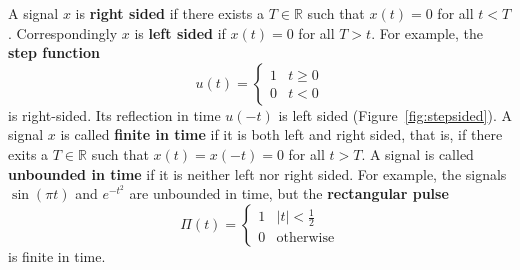 \documentclass[11pt,a4paper]{book}
\theoremstyle{plain}
\numberwithin{equation}{section}
\newcommand{\reals}{{\mathbb R}}
\newcommand{\term}{\textbf}
\newcommand{\abs}[1]{\left\vert #1 \right\vert}
\begin{document}
\newcommand{\rect}{\Pi}

A signal $x$ is \term{right sided} if there exists a $T \in \reals$ such that $x(t) = 0$ for all $t < T$.  Correspondingly $x$ is \term{left sided} if $x(t) = 0$ for all $T > t$.  For example, the \term{step function} 
\begin{equation} \label{eq:stepfunction}
u(t) = \begin{cases}
1 & t \geq 0 \\
0 & t < 0
\end{cases}
\end{equation}
is right-sided.  Its reflection in time $u(-t)$ is left sided (Figure~\ref{fig:stepsided}).  A signal $x$ is called \term{finite in time} if it is both left and right sided, that is, if there exits a $T\in\reals$ such that $x(t) = x(-t) = 0$ for all $t > T$.  A signal is called \term{unbounded in time} if it is neither left nor right sided.  For example, the signals $\sin( \pi t)$ and $e^{-t^2}$ are unbounded in time, but the \term{rectangular pulse}
\begin{equation}\label{eq:rectfuncdefn}
\rect(t) = \begin{cases} 
1 & \abs{t} < \frac{1}{2}\\
0 & \text{otherwise}
\end{cases}
\end{equation}
is finite in time.  %
\end{document}
